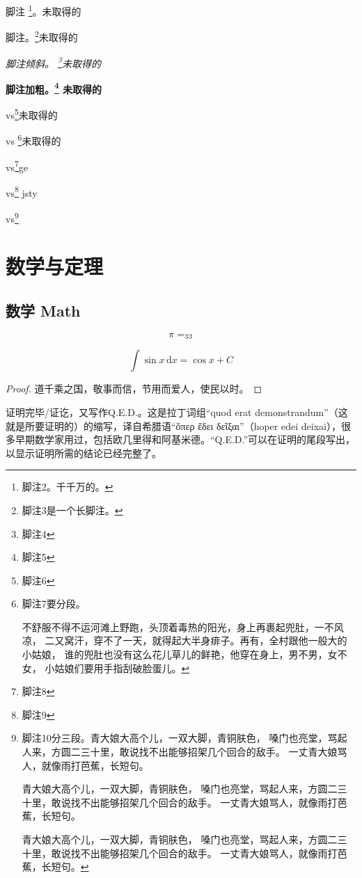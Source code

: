 脚注 \footnote{脚注2。千千万的。}。未取得的

脚注。\footnote{脚注3是一个长脚注。\zhlipsum*[2]}未取得的

\textit{脚注倾斜。 \footnote{脚注4}未取得的}

\textbf{脚注加粗。\footnote{脚注5} 未取得的}

vs\footnote{脚注6}未取得的

vs \footnote{脚注7要分段。\par 不舒服不得不运河滩上野跑，头顶着毒热的阳光，身上再裹起兜肚，一不风凉，
二又窝汗，穿不了一天，就得起大半身痱子。再有，全村跟他一般大的小姑娘，
谁的兜肚也没有这么花儿草儿的鲜艳，他穿在身上，男不男，女不女，
小姑娘们要用手指刮破脸蛋儿。}未取得的

vs\footnote{脚注8}ge

vs\footnote{脚注9} jsty

vs\footnote{脚注10分三段。青大娘大高个儿，一双大脚，青铜肤色，
嗓门也亮堂，骂起人来，方圆二三十里，敢说找不出能够招架几个回合的敌手。
一丈青大娘骂人，就像雨打芭蕉，长短句。\par
青大娘大高个儿，一双大脚，青铜肤色，
嗓门也亮堂，骂起人来，方圆二三十里，敢说找不出能够招架几个回合的敌手。
一丈青大娘骂人，就像雨打芭蕉，长短句。 \par
青大娘大高个儿，一双大脚，青铜肤色，
嗓门也亮堂，骂起人来，方圆二三十里，敢说找不出能够招架几个回合的敌手。
一丈青大娘骂人，就像雨打芭蕉，长短句。}

\chapter{数学与定理}
\section{数学 Math}
\[\pi=\sb{33}\]

\[
  \int\sin x\,\mathrm{d}x=\cos x + C
\]

\begin{proof}
道千乘之国，敬事而信，节用而爱人，使民以时。
\end{proof}

\begin{definition}
证明完毕/证讫，又写作Q.E.D.。这是拉丁词组“quod erat demonstrandum”（这就是所要证明的）的缩写，译自希腊语“ὅπερ ἔδει δεῖξαι”（hoper edei deixai），很多早期数学家用过，包括欧几里得和阿基米德。“Q.E.D.”可以在证明的尾段写出，以显示证明所需的结论已经完整了。
\end{definition}

